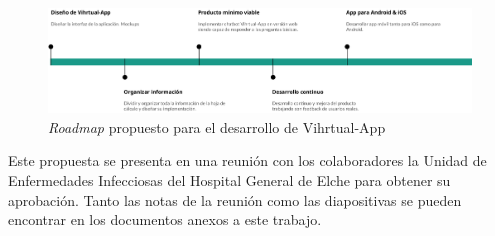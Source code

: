 \begin{figure}[htbp]
\centering
\includegraphics[scale=0.4]{../images/roadmap.png} 
\caption{\textit{Roadmap} propuesto para el desarrollo de Vihrtual-App}
\label{fig:roadmap desarrollo}
\end{figure}

Este propuesta se presenta en una reunión con los colaboradores la Unidad de Enfermedades Infecciosas del Hospital General de Elche para obtener su aprobación. Tanto las notas de la reunión como las diapositivas se pueden encontrar en los documentos anexos a este trabajo.\\